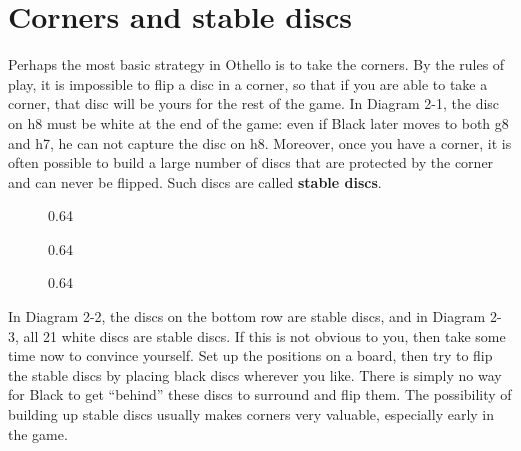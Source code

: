 \documentclass[a4paper,12pt]{book}
\newcommand{\jargon}[1]{\textbf{#1}}
\newcommand{\scalefactorthreeup}{0.64}
\begin{document}
\chapter{Corners and stable discs}
Perhaps the most basic strategy in Othello is to take the corners. By the rules of
play, it is impossible to flip a disc in a corner, so that if you are able to take a corner,
that disc will be yours for the rest of the game. In Diagram 2-1, the disc on h8 must be
white at the end of the game: even if Black later moves to both g8 and h7, he can not
capture the disc on h8. Moreover, once you have a corner, it is often possible to build
a large number of discs that are protected by the corner and can never be flipped.
Such discs are called \jargon{stable discs}.

\begin{figure}[h!]
\begin{center}
\begin{minipage}[t]{.32\textwidth}
\begin{othelloboard}{\scalefactorthreeup}
\dotmarkings
{}
\end{othelloboard}
\caption{}
\end{minipage}
\hfill
\begin{minipage}[t]{.32\textwidth}
\begin{othelloboard}{\scalefactorthreeup}
\dotmarkings
{}
\end{othelloboard}
\caption{}
\end{minipage}
\hfill
\begin{minipage}[t]{.32\textwidth}
\begin{othelloboard}{\scalefactorthreeup}
\dotmarkings
{}
\end{othelloboard}
\caption{}
\end{minipage}
\end{center}
\end{figure}

In Diagram 2-2, the discs on the bottom row are stable discs, and in Diagram 2-3, 
all 21 white discs are stable discs. If this is not obvious to you, then take some time
now to convince yourself. Set up the positions on a board, then try to flip the stable
discs by placing black discs wherever you like. There is simply no way for Black to
get ``behind'' these discs to surround and flip them. The possibility of building up
stable discs usually makes corners very valuable, especially early in the game.
\end{document}
